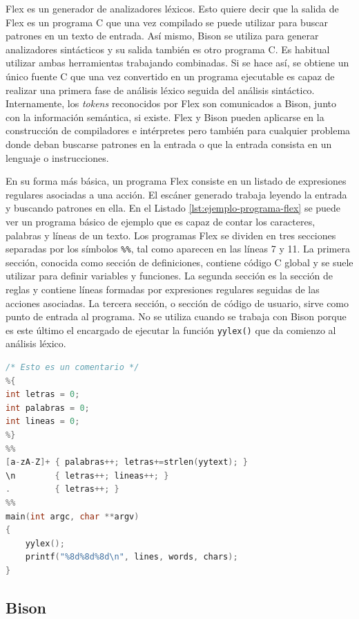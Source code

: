 Flex es un generador de analizadores léxicos. Esto quiere decir que la salida de Flex es un programa C que una vez compilado se puede utilizar para buscar patrones en un texto de entrada. Así mismo, Bison se utiliza para generar analizadores sintácticos y su salida también es otro programa C. Es habitual utilizar ambas herramientas trabajando combinadas. Si se hace así, se obtiene un único fuente C que una vez convertido en un programa ejecutable es capaz de realizar una primera fase de análisis léxico seguida del análisis sintáctico. Internamente, los \emph{tokens} reconocidos por Flex son comunicados a Bison, junto con la información semántica, si existe. Flex y Bison pueden aplicarse en la construcción de compiladores e intérpretes pero también para cualquier problema donde deban buscarse patrones en la entrada o que la entrada consista en un lenguaje o instrucciones.

En su forma más básica, un programa Flex consiste en un listado de expresiones regulares asociadas a una acción. El escáner generado trabaja leyendo la entrada y buscando patrones en ella. En el Listado \ref{lst:ejemplo-programa-flex} se puede ver un programa básico de ejemplo que es capaz de contar los caracteres, palabras y líneas de un texto. Los programas Flex se dividen en tres secciones separadas por los símbolos \verb|%%|, tal como aparecen en las líneas 7 y 11. La primera sección, conocida como sección de definiciones, contiene código C global y se suele utilizar para definir variables y funciones. La segunda sección es la sección de reglas y contiene líneas formadas por expresiones regulares seguidas de las acciones asociadas. La tercera sección, o sección de código de usuario, sirve como punto de entrada al programa. No se utiliza cuando se trabaja con Bison porque es este último el encargado de ejecutar la función \verb|yylex()| que da comienzo al análisis léxico.

\begin{lstlisting}[language=C,caption={Ejemplo de programa Flex mínimo},label=lst:ejemplo-programa-flex]
/* Esto es un comentario */
%{
int letras = 0;
int palabras = 0;
int lineas = 0;
%}
%%
[a-zA-Z]+ { palabras++; letras+=strlen(yytext); }
\n        { letras++; lineas++; }
.         { letras++; }
%%
main(int argc, char **argv)
{
    yylex();
    printf("%8d%8d%8d\n", lines, words, chars);
}
\end{lstlisting}

\subsection{Bison}

